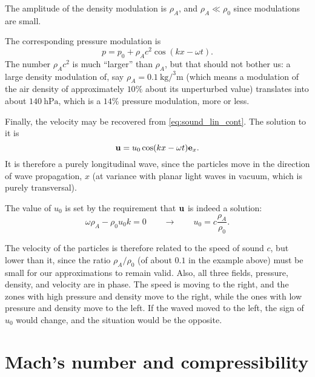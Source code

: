 The amplitude of the density modulation is $\rho_A$, and $\rho_A \ll
\rho_0$ since modulations are small.

The corresponding pressure modulation is
\[
p =  p_0 + \rho_A c^2  \cos(k x  - \omega t) .
\]
The number $ \rho_A c^2 $ is much ``larger'' than $\rho_A$, but that
should not bother us: a large density modulation of, say $\rho_A=
{\SI{0.1}{\kilo\gram\per\cubed\meter}}$ (which means a modulation of
the air density of approximately $10\%$ about its unperturbed value)
translates into about ${\SI{140}{\hecto\pascal}}$, which is a $14\%$
pressure modulation, more or less.

Finally, the velocity may be recovered from \ref{eq:sound_lin_cont}. The
solution to it is
\[
\mathbf{u} = u_0  \cos(k x  - \omega t) \mathbf{e}_x .
\]
It is therefore a purely longitudinal wave, since the particles move
in the direction of wave propagation, $x$ (at variance with planar
light waves in vacuum, which is purely transversal).

The value of $u_0$ is set by the requirement that $\mathbf{u}$ is indeed a
solution:
\[
\omega \rho_A - \rho_0 u_0 k = 0 \qquad\to\qquad
u_0 = c \frac{\rho_A}{\rho_0} .
\]

The velocity of the particles is therefore related to the speed of
sound $c$, but lower than it, since the ratio $\rho_A / \rho_0$ (of
about $0.1$ in the example above) must be small for our approximations
to remain valid. Also, all three fields, pressure, density, and
velocity are in phase. The speed is moving to the right, and the zones
with high pressure and density move to the right, while the ones with
low pressure and density move to the left. If the waved moved to the
left, the sign of $u_0$ would change, and the situation would be the
opposite.


\section{Mach's number and compressibility}
